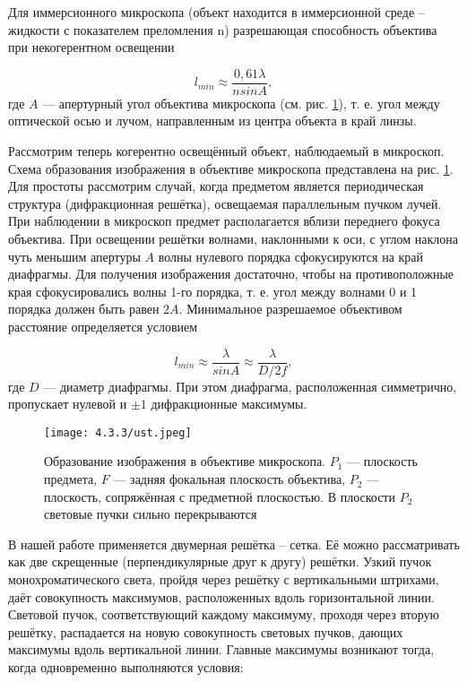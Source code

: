 \documentclass[a4paper,12pt]{article} %
\begin{document}
Для иммерсионного микроскопа (объект находится в иммерсионной среде -- жидкости с показателем преломления n) разрешающая способность объектива при некогерентном освещении

\begin{equation*}
    l_{min}\approx\frac{0,61\lambda}{n sin A},
\end{equation*}
где $A$ — апертурный угол объектива микроскопа (см. рис. \ref{ust}), т. е. угол между оптической осью и лучом, направленным из центра объекта в край линзы.

Рассмотрим теперь когерентно освещённый объект, наблюдаемый в микроскоп. Схема образования изображения в объективе микроскопа представлена на рис. \ref{ust}. Для простоты рассмотрим случай, когда предметом является периодическая структура (дифракционная решётка), освещаемая параллельным пучком лучей. При наблюдении в микроскоп предмет располагается вблизи переднего фокуса объектива. При освещении решётки волнами, наклонными к оси, с углом наклона чуть меньшим апертуры $A$ волны нулевого порядка сфокусируются на край диафрагмы. Для получения изображения достаточно, чтобы на противоположные края сфокусировались волны 1-го порядка, т. е. угол между волнами 0 и 1 порядка должен быть равен $2A$. Минимальное разрешаемое объективом расстояние определяется условием

\begin{equation}
    l_{min} \approx\frac{\lambda}{sinA} \approx\frac{\lambda}{D/2f},
    \label{diaf}
\end{equation}
где $D$ — диаметр диафрагмы. При этом диафрагма, расположенная симметрично, пропускает нулевой и $\pm 1$ дифракционные максимумы.

\begin{figure}[H]
    \centering
    \texttt{[image: 4.3.3/ust.jpeg]}
    \caption{\centering Образование изображения в объективе микроскопа. $P_1$ — плоскость предмета, $F$ — задняя фокальная плоскость объектива, $P_2$ — плоскость, сопряжённая с предметной плоскостью. В плоскости $P_2$ световые пучки сильно перекрываются
}
    \label{ust}
\end{figure}

В нашей работе применяется двумерная решётка -- сетка. Её можно рассматривать как две скрещенные (перпендикулярные друг к другу) решётки. Узкий пучок монохроматического света, пройдя через решётку с вертикальными штрихами, даёт совокупность максимумов, расположенных вдоль горизонтальной линии. Световой пучок, соответствующий каждому максимуму, проходя через вторую решётку, распадается на новую совокупность световых пучков, дающих максимумы вдоль вертикальной линии. Главные максимумы возникают тогда, когда одновременно выполняются условия:
\end{document}
